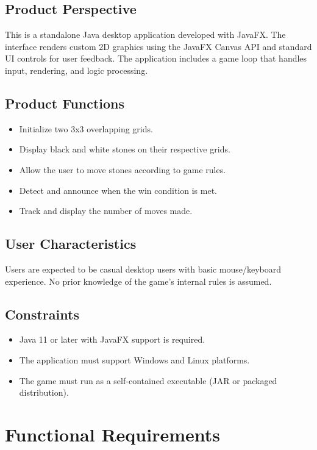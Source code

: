 \documentclass[11.5pt, oneside]{scrartcl}
\begin{document}
	\subsection{Product Perspective}
	This is a standalone Java desktop application developed with JavaFX. The interface renders custom 2D graphics using the JavaFX Canvas API and standard UI controls for user feedback. The application includes a game loop that handles input, rendering, and logic processing.
	
	\subsection{Product Functions}
	\begin{itemize}[noitemsep]
		\item Initialize two 3x3 overlapping grids.
		\item Display black and white stones on their respective grids.
		\item Allow the user to move stones according to game rules.
		\item Detect and announce when the win condition is met.
		\item Track and display the number of moves made.
	\end{itemize}
	
	\subsection{User Characteristics}
	Users are expected to be casual desktop users with basic mouse/keyboard experience. No prior knowledge of the game's internal rules is assumed.
	
	\subsection{Constraints}
	\begin{itemize}[noitemsep]
		\item Java 11 or later with JavaFX support is required.
		\item The application must support Windows and Linux platforms.
		\item The game must run as a self-contained executable (JAR or packaged distribution).
	\end{itemize}
	
	\section{Functional Requirements}
	
\end{document}

